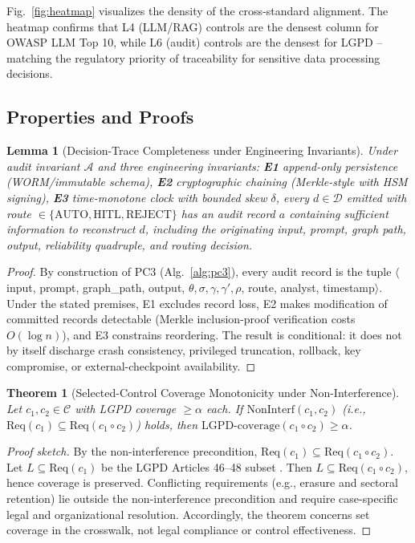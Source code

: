 \documentclass[journal]{IEEEtran}
\newtheorem{lemma}{Lemma}
\newtheorem{theorem}{Theorem}
\begin{document}
Fig.~\ref{fig:heatmap} visualizes the density of the cross-standard alignment.
The heatmap confirms that L4 (LLM/RAG) controls are the densest column for OWASP LLM
Top 10, while L6 (audit) controls are the densest for LGPD -- matching the regulatory
priority of traceability for sensitive data processing decisions.

\subsection{Properties and Proofs}
\label{ssec:properties}

\begin{lemma}[Decision-Trace Completeness under Engineering Invariants]
\label{lem:audit}
Under audit invariant $\mathcal{A}$ and three engineering invariants:
\textbf{E1} append-only persistence (WORM/immutable schema),
\textbf{E2} cryptographic chaining (Merkle-style with HSM signing),
\textbf{E3} time-monotone clock with bounded skew $\delta$,
every $d \in \mathcal{D}$ emitted with route $\in \{\text{AUTO},\text{HITL},\text{REJECT}\}$
has an audit record $a$ containing sufficient information to reconstruct $d$, including the
originating input, prompt, graph path, output, reliability quadruple, and routing decision.
\end{lemma}
\begin{proof}
By construction of PC3 (Alg.~\ref{alg:pc3}), every audit record is the tuple
$\langle$input, prompt, graph\_path, output, $\theta,\sigma,\gamma,\gamma',\rho$,
route, analyst, timestamp$\rangle$.
Under the stated premises, E1 excludes record loss, E2 makes modification of committed records
detectable (Merkle inclusion-proof verification costs $O(\log n)$), and E3 constrains reordering.
The result is conditional: it does not by itself discharge crash consistency, privileged
truncation, rollback, key compromise, or external-checkpoint availability.
\end{proof}

\begin{theorem}[Selected-Control Coverage Monotonicity under Non-Interference]
\label{thm:compliance}
Let $c_1, c_2 \in \mathcal{C}$ with LGPD coverage $\geq \alpha$ each. If
$\mathrm{NonInterf}(c_1, c_2)$ (i.e., $\mathrm{Req}(c_1) \subseteq \mathrm{Req}(c_1 \circ c_2)$)
holds, then $\mathrm{LGPD\text{-}coverage}(c_1 \circ c_2) \geq \alpha$.
\end{theorem}
\begin{proof}[Proof sketch]
By the non-interference precondition, $\mathrm{Req}(c_1) \subseteq \mathrm{Req}(c_1 \circ c_2)$.
Let $L \subseteq \mathrm{Req}(c_1)$ be the LGPD Articles 46--48 subset \cite{lgpd2018}.
Then $L \subseteq \mathrm{Req}(c_1 \circ c_2)$, hence coverage is preserved.
Conflicting requirements (e.g., erasure and sectoral retention) lie outside the
non-interference precondition and require case-specific legal and organizational resolution.
Accordingly, the theorem concerns set coverage in the crosswalk, not legal compliance or
control effectiveness.
\end{proof}
\end{document}
